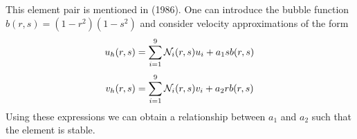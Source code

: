 This element pair is mentioned in \textcite{caod86} (1986).
One can introduce the bubble function
$b(r,s)=(1-r^2)(1-s^2)$ and consider velocity approximations of the form
\[
u_h(r,s) = \sum_{i=1}^9 {\mathcal{N}}_i (r,s) u_i + a_1 s b(r,s)
\]
\[
v_h(r,s) = \sum_{i=1}^9 {\mathcal{N}}_i (r,s) v_i + a_2 r b(r,s)
\]
Using these expressions we can obtain a relationship between $a_1$
and $a_2$ such that the element is stable.

